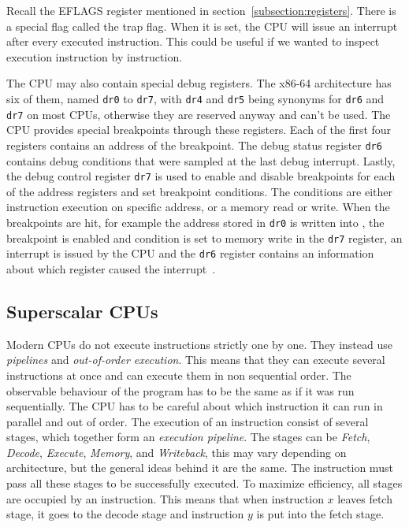 Recall the EFLAGS register mentioned in section~\ref{subsection:registers}.
There is a special flag called the trap flag. When it is set, the CPU will
issue an interrupt after every executed instruction. This could be useful if we
wanted to inspect execution instruction by instruction.

The CPU may also contain special debug registers. The x86-64 architecture has
six of them, named \texttt{dr0} to \texttt{dr7}, with \texttt{dr4} and
\texttt{dr5} being synonyms for \texttt{dr6} and \texttt{dr7} on most CPUs,
otherwise they are reserved anyway and can't be used. The CPU provides special
breakpoints through these registers. Each of the first four registers contains
an address of the breakpoint. The debug status register \texttt{dr6} contains
debug conditions that were sampled at the last debug interrupt. Lastly, the
debug control register \texttt{dr7} is used to enable and disable breakpoints
for each of the address registers and set breakpoint conditions. The conditions
are either instruction execution on specific address, or a memory read or
write. When the breakpoints are hit, for example the address stored in
\texttt{dr0} is written into , the breakpoint is enabled and condition is set
to memory write in the \texttt{dr7} register, an interrupt is issued by the
CPU and the \texttt{dr6} register contains an information about which register
caused the interrupt~\cite{intel-manual}.

\subsection{Superscalar CPUs}\label{section:superscalar-cpu}
Modern CPUs do not execute instructions strictly one by one. They instead use
\textit{pipelines} and \textit{out-of-order execution}. This means that they
can execute several instructions at once and can execute them in non sequential
order. The observable behaviour of the program has to be the same as if it was
run sequentially. The CPU has to be careful about which instruction it can run
in parallel and out of order. The execution of an instruction consist of
several stages, which together form an \textit{execution pipeline}. The stages
can be \textit{Fetch}, \textit{Decode}, \textit{Execute}, \textit{Memory}, and
\textit{Writeback}, this may vary depending on architecture, but the general
ideas behind it are the same. The instruction must pass all these stages to be
successfully executed. To maximize efficiency, all stages are occupied by an
instruction. This means that when instruction $x$ leaves fetch stage, it goes
to the decode stage and instruction $y$ is put into the fetch stage.

